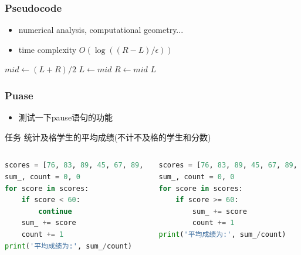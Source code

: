 \begin{frame}[containsverbatim]\frametitle{\LARGE Pseudocode}
\begin{itemize}
\item numerical analysis, computational geometry...
\item time complexity $O(\log{((R-L)/\epsilon)})$
\end{itemize}

\begin{algorithm}[H]
\label{BinarySearch}
\begin{algorithmic}[1]
\State $mid \gets (L+R)/2$
\State $L \gets mid$
\Else 
\State $R \gets mid$
\EndIf
\EndWhile
\Return $L$
\EndProcedure
\end{algorithmic}
\end{algorithm}
\end{frame}


\begin{frame}[t, fragile]\frametitle{\LARGE Puase}
\begin{itemize}
\item 测试一下{\red pause}语句的功能
\end{itemize}

\pause
\begin{block}{任务}
统计及格学生的平均成绩(不计不及格的学生和分数)
\end{block}

\pause
\begin{columns}[t]

\begin{lstlisting}[language=Python]
scores = [76, 83, 89, 45, 67, 89, 85, 77]
sum_, count = 0, 0
for score in scores:
    if score < 60:
        continue
    sum_ += score
    count += 1
print('平均成绩为:', sum_/count)
\end{lstlisting}

\pause
\begin{lstlisting}[language=Python]
scores = [76, 83, 89, 45, 67, 89, 85, 77]
sum_, count = 0, 0
for score in scores:
    if score >= 60:
        sum_ += score
        count += 1
print('平均成绩为:', sum_/count)
\end{lstlisting}
\end{columns}

\end{frame}

